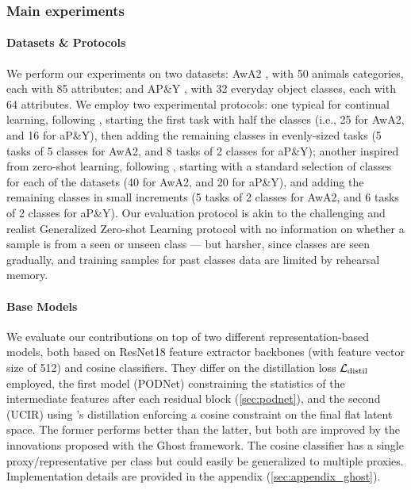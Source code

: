 \subsubsection{Main experiments}
\label{sec:ghost_quantitative}

\paragraph{Datasets \& Protocols} We perform our experiments on two datasets: AwA2
\citet{xian2019awa2}, with 50 animals categories, each with 85 attributes; and AP\&Y
\citet{farhadi2009apy}, with 32 everyday object classes, each with 64 attributes. We employ two
experimental protocols: one typical for continual learning, following
\citet{hou2019ucir}, starting the first task with half the classes (i.e., 25 for
AwA2, and 16 for aP\&Y), then adding the remaining classes in evenly-sized tasks (5 tasks of 5
classes for AwA2, and 8 tasks of 2 classes for aP\&Y); another inspired from zero-shot learning,
following \citet{xian2019awa2}, starting with a standard selection of classes for each of the
datasets (40 for AwA2, and 20 for aP\&Y), and adding the remaining classes in small increments (5
tasks of 2 classes for AwA2, and 6 tasks of 2 classes for aP\&Y). Our evaluation protocol is akin to
the challenging and realist Generalized Zero-shot Learning \citep{scheirer2013generalizedzeroshot,
    chao2016generalizedzeroshot} protocol with no information on whether a sample is from a seen or
unseen class — but harsher, since classes are seen gradually, and training samples for past classes
data are limited by rehearsal memory.

\paragraph{Base Models} We evaluate our contributions on top of two different representation-based
models, both based on ResNet18 \citep{he2016resnet} feature extractor backbones (with feature vector
size of 512) and cosine classifiers. They differ on the distillation loss $\mathcal{L}_\text{distil}$
employed, the first model (PODNet) constraining the statistics of the intermediate features after
each residual block (\autoref{sec:podnet}), and the second (UCIR) using \citet{hou2019ucir}'s
distillation enforcing a cosine constraint on the final flat latent space. The former performs
better than the latter, but both are improved by the innovations proposed with the Ghost framework.
The cosine classifier has a single proxy/representative per class but could easily be generalized to
multiple proxies. Implementation details are provided in the appendix
(\autoref{sec:appendix_ghost}).


